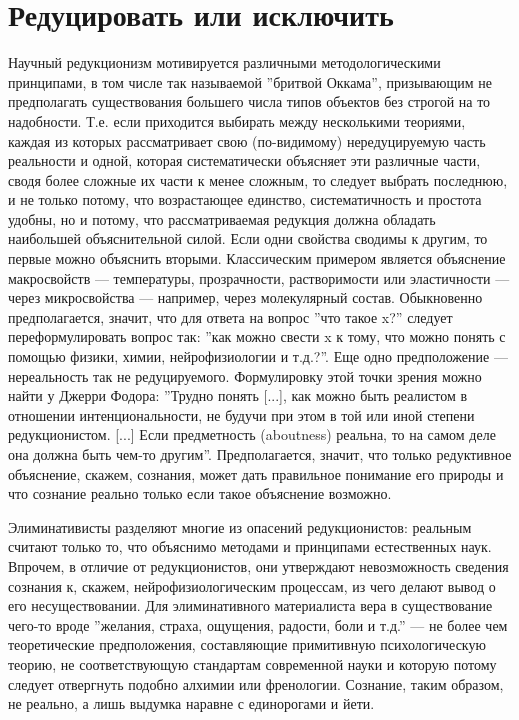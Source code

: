 \documentclass[11pt]{book}
\begin{document}
\section{Редуцировать или исключить}

Научный редукционизм мотивируется различными методологическими принципами, в том числе так называемой ''бритвой Оккама'', призывающим не предполагать существования большего числа типов объектов без строгой на то надобности. Т.е. если приходится выбирать между несколькими теориями, каждая из которых рассматривает свою (по-видимому) нередуцируемую часть реальности и одной, которая систематически объясняет эти различные части, сводя более сложные их части к менее сложным, то следует выбрать последнюю, и не только потому, что возрастающее единство, систематичность и простота удобны, но и потому, что рассматриваемая редукция должна обладать наибольшей объяснительной силой. Если одни свойства сводимы к другим, то первые можно объяснить вторыми. Классическим примером является объяснение макросвойств --- температуры, прозрачности, растворимости или эластичности --- через микросвойства --- например, через молекулярный состав. Обыкновенно предполагается, значит, что для ответа на вопрос ''что такое x?'' следует переформулировать вопрос так: ''как можно свести x к тому, что можно понять с помощью физики, химии, нейрофизиологии и т.д.?''. Еще одно предположение --- нереальность так не редуцируемого. Формулировку этой точки зрения можно найти у Джерри Фодора: ''Трудно понять [...], как можно быть реалистом в отношении интенциональности, не будучи при этом в той или иной степени редукционистом. [...] Если предметность (aboutness) реальна, то на самом деле она должна быть чем-то другим''. Предполагается, значит, что только редуктивное объяснение, скажем, сознания, может дать правильное понимание его природы и что сознание реально только если такое объяснение возможно.

Элиминативисты разделяют многие из опасений редукционистов: реальным считают только то, что объяснимо методами и принципами естественных наук. Впрочем, в отличие от редукционистов, они утверждают невозможность сведения сознания к, скажем, нейрофизиологическим процессам, из чего делают вывод о его несуществовании. Для элиминативного материалиста вера в существование чего-то вроде ''желания, страха, ощущения, радости, боли и т.д.'' --- не более чем теоретические предположения, составляющие примитивную психологическую теорию, не соответствующую стандартам современной науки и которую потому следует отвергнуть подобно алхимии или френологии. Сознание, таким образом, не реально, а лишь выдумка наравне с единорогами и йети.
\end{document}
